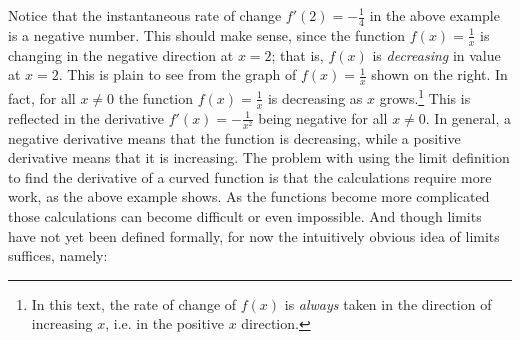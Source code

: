  Notice that the instantaneous rate of change $f'(2) = -\frac{1}{4}$ in the
 above example is a negative number. This should make sense, since the
 function $f(x) = \frac{1}{x}$ is changing in the negative direction
 at $x=2$; that is, $f(x)$ is \emph{decreasing} in value at $x=2$. This is
 plain to see from the graph of $f(x) = \frac{1}{x}$ shown on the right. In
 fact, for all $x \ne 0$ the function $f(x) = \frac{1}{x}$ is decreasing as $x$
 grows.\footnote{In this text, the rate of change of $f(x)$ is \emph{always}
 taken in the direction of increasing $x$, i.e. in the positive $x$ direction.}
 This is reflected in the derivative $f'(x) =  -\frac{1}{x^2}$ being negative for
 all $x \ne 0$. In general, a negative derivative means that the function is
 decreasing, while a positive derivative means that it is increasing.
\newpage
The problem with using the limit definition to find the derivative of a curved
function is that the calculations require more work, as the above example shows.
As the functions become more complicated those calculations can become
difficult or even impossible. And though limits have not yet been defined formally,
for now the intuitively obvious idea of limits suffices, namely:


